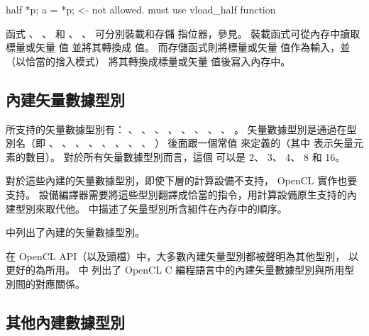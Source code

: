 half *p;
a = *p;		<- not allowed. must use vload_half function
\stopclc

函式 、 、 
和 、 、 
可分別裝載和存儲  指位器，參見\insection[vectorLsFunc]。
裝載函式可從內存中讀取標量或矢量  值 並將其轉換成  值。
而存儲函式則將標量或矢量  值作為輸入，並（以恰當的捨入模式）
將其轉換成標量或矢量  值後寫入內存中。


\subsection[section:bivdt]{內建矢量數據型別}

所支持的矢量數據型別有：
、 、
、 、
、 、
、 、
。
矢量數據型別是通過在型別名（即
、 、
、 、
、 、
、 、
）
後面跟一個常值  來定義的（其中  表示矢量元素的數目）。
對於所有矢量數據型別而言，這個  可以是 2、 3、 4、 8 和 16。

\startnotepar
對於這些內建的矢量數據型別，即使下層的計算設備不支持， OpenCL 實作也要支持。
設備編譯器需要將這些型別翻譯成恰當的指令，用計算設備原生支持的內建型別來取代他。
\inappendix[port]中描述了矢量型別所含組件在內存中的順序。
\stopnotepar

中列出了內建的矢量數據型別。

{}

在 OpenCL API（以及頭檔）中，大多數內建矢量型別都被聲明為其他型別，
以更好的為所用。
中
列出了 OpenCL C 編程語言中的內建矢量數據型別與所用型別間的對應關係。

{}

\subsection[section:obidt]{其他內建數據型別}

